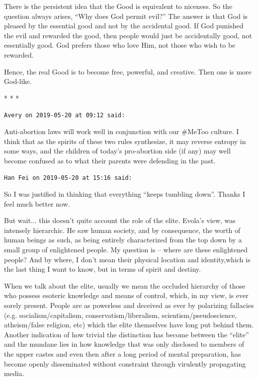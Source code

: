 There is the persistent idea that the Good is equivalent to niceness. So the question always arises, ``Why does God permit evil?'' The answer is that God is pleased by the essential good and not by the accidental good. If God punished the evil and rewarded the good, then people would just be accidentally good, not essentially good. God prefers those who love Him, not those who wish to be rewarded.

Hence, the real Good is to become free, powerful, and creative. Then one is more God-like.



\begin{center}* * *\end{center}

\begin{footnotesize}
\begin{sffamily}
\texttt{Avery on 2019-05-20 at 09:12 said:}

Anti-abortion laws will work well in conjunction with our \#MeToo culture. I think that as the spirits of these two rules synthesize, it may reverse entropy in some ways, and the children of today's pro-abortion side (if any) may well become confused as to what their parents were defending in the past.

\hfill

\texttt{Han Fei on 2019-05-20 at 15:16 said:}

So I was justified in thinking that everything ``keeps tumbling down''. Thanks I feel much better now.

But wait... this doesn't quite account the role of the elite. Evola's view, was intensely hierarchic. He saw human society, and by consequence, the worth of human beings as such, as being entirely characterized from the top down by a small group of enlightened people. My question is -- where are these enlightened people? And by where, I don't mean their physical location and identity,which is the last thing I want to know, but in terms of spirit and destiny.

When we talk about the elite, usually we mean the occluded hierarchy of those who possess esoteric knowledge and means of control, which, in my view, is ever sorely present. People are as powerless and deceived as ever by polarizing fallacies (e.g. socialism/capitalism, conservatism/liberalism, scientism/pseudoscience, atheism/false religion, etc) which the elite themselves have long put behind them. Another indication of how trivial the distinction has become between the ``elite'' and the mundane lies in how knowledge that was only disclosed to members of the upper castes and even then after a long period of mental preparation, has become openly disseminated without constraint through virulently propagating media.


\end{sffamily}
\end{footnotesize}
